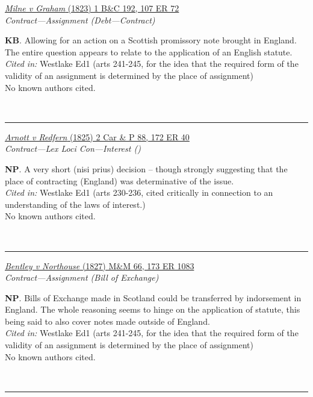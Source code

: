 \documentclass[twoside]{article}
\begin{document}
        \begin{small}
        \begin{center}
        \href{https://heinonline.org/HOL/P?h=hein.engrep/engrf0107&i=76}{\textit{Milne v Graham} (1823) 1 B\&C 192, 107 ER 72} \label{48} \\ 
\textit{Contract---Assignment (Debt---Contract)}\\
        \end{center}
        \textbf{KB}. Allowing for an action on a Scottish promissory note brought in England. The entire question appears to relate to the application of an English statute.\\\textit{Cited in: }Westlake Ed1 (arts 241-245, for the idea that the required form of the validity of an assignment is determined by the place of assignment)\\No known authors cited.
        \end{small}\\
        \rule{\textwidth}{0.5pt}
        

        \begin{small}
        \begin{center}
        \href{None}{\textit{Arnott v Redfern} (1825) 2 Car \& P 88, 172 ER 40} \label{35} \\ 
\textit{Contract---Lex Loci Con---Interest ()}\\
        \end{center}
        \textbf{NP}. A very short (nisi prius) decision – though strongly suggesting that the place of contracting (England) was determinative of the issue.\\\textit{Cited in: }Westlake Ed1 (arts 230-236, cited critically in connection to an understanding of the laws of interest.)\\No known authors cited.
        \end{small}\\
        \rule{\textwidth}{0.5pt}
        

        \begin{small}
        \begin{center}
        \href{https://heinonline.org/HOL/P?h=hein.engrep/engrk0173&i=1087}{\textit{Bentley v Northouse} (1827) M\&M 66, 173 ER 1083} \label{49} \\ 
\textit{Contract---Assignment (Bill of Exchange)}\\
        \end{center}
        \textbf{NP}. Bills of Exchange made in Scotland could be transferred by indorsement in England. The whole reasoning seems to hinge on the application of statute, this being said to also cover notes made outside of England.\\\textit{Cited in: }Westlake Ed1 (arts 241-245, for the idea that the required form of the validity of an assignment is determined by the place of assignment)\\No known authors cited.
        \end{small}\\
        \rule{\textwidth}{0.5pt}
        
\end{document}
